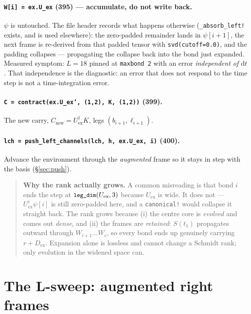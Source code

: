 \documentclass[11pt,a4paper]{article}
\newcommand{\code}[1]{\texttt{\small #1}}
\newcommand{\Uex}{U_{\mathrm{ex}}}
\newcommand{\Dex}{D_{\mathrm{ex}}}
\newcommand{\dd}{\mathrm{d}}
\begin{document}
\paragraph{\code{W[i] = ex.U\_ex} (395) --- accumulate, do not write back.} $\psi$ is untouched.
The file header records what happens otherwise (\code{\_absorb\_left!} exists, and is used
elsewhere): the zero-padded remainder lands in $\psi[i+1]$, the next frame is re-derived from
that padded tensor with \code{svd(cutoff=0.0)}, and the padding collapses --- propagating the
collapse back into the bond just expanded. Measured symptom: $L=18$ pinned at \code{maxbond 2}
with an error \emph{independent of $\dd t$}. That independence is the diagnostic: an error that
does not respond to the time step is not a time-integration error.

\paragraph{\code{C = contract(ex.U\_ex', (1,2), K, (1,2))} (399).} The new carry,
$C_{\text{new}} = \Uex^\dagger K$, legs $(b_{i+1},\ell_{i+1})$.

\paragraph{\code{lch = push\_left\_channels(lch, h, ex.U\_ex, i)} (400).} Advance the
environment through the \emph{augmented} frame so it stays in step with the basis
(\S\ref{sec:push}).

\begin{quote}
\color{note}
\textbf{Why the rank actually grows.} A common misreading is that bond $i$ ends the step at
$\code{leg\_dim}(\Uex,3)$ because $\Uex$ is wide. It does not --- $\Uex^\dagger\psi[i]$ is still
zero-padded here, and a \code{canonical!} would collapse it straight back. The rank grows
because (i) the centre core is \emph{evolved} and comes out \emph{dense}, and (ii) the frames
are \emph{retained}: $S(t_1)$ propagates outward through $W_{i+1}\dots W_c$, so every bond ends
up genuinely carrying $r+\Dex$. Expansion alone is lossless and cannot change a Schmidt rank;
only evolution in the widened space can.
\end{quote}

\section{The L-sweep: augmented right frames}
\label{sec:lsweep}
\end{document}
